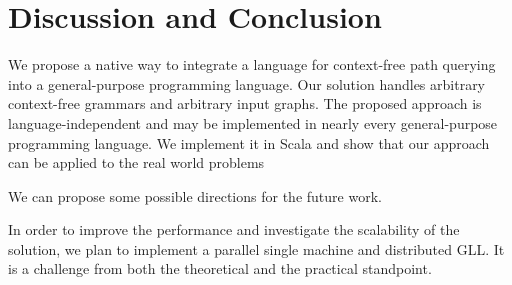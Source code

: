 \section{Discussion and Conclusion}
\label{sec:conclusion}

We propose a native way to integrate a language for context-free path querying into a general-purpose programming language.
Our solution handles arbitrary context-free grammars and arbitrary input graphs.
The proposed approach is language-independent and may be implemented in nearly every general-purpose programming language.
We implement it in Scala and show that our approach can be applied to the real world problems


We can propose some possible directions for the future work.

%
In order to improve the performance and investigate the scalability of the solution, we plan to implement a parallel single machine and distributed GLL. 
It is a challenge from both the theoretical and the practical standpoint.


